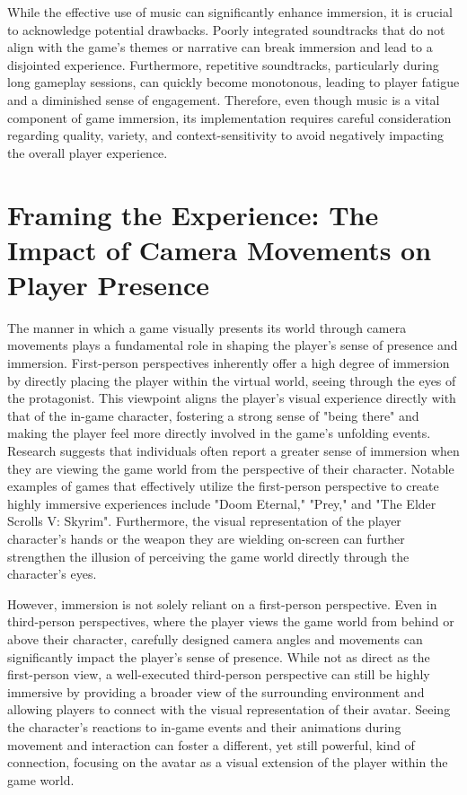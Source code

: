 \documentclass{article}
\begin{document}
    While the effective use of music can significantly enhance immersion, it is crucial to acknowledge potential drawbacks. Poorly integrated soundtracks that do not align with the game's themes or narrative can break immersion and lead to a disjointed experience. Furthermore, repetitive soundtracks, particularly during long gameplay sessions, can quickly become monotonous, leading to player fatigue and a diminished sense of engagement. Therefore, even though music is a vital component of game immersion, its implementation requires careful consideration regarding quality, variety, and context-sensitivity to avoid negatively impacting the overall player experience.

    \section{Framing the Experience: The Impact of Camera Movements on Player Presence}

    The manner in which a game visually presents its world through camera movements plays a fundamental role in shaping the player's sense of presence and immersion. First-person perspectives inherently offer a high degree of immersion by directly placing the player within the virtual world, seeing through the eyes of the protagonist. This viewpoint aligns the player's visual experience directly with that of the in-game character, fostering a strong sense of "being there" and making the player feel more directly involved in the game's unfolding events. Research suggests that individuals often report a greater sense of immersion when they are viewing the game world from the perspective of their character. Notable examples of games that effectively utilize the first-person perspective to create highly immersive experiences include "Doom Eternal," "Prey," and "The Elder Scrolls V: Skyrim". Furthermore, the visual representation of the player character's hands or the weapon they are wielding on-screen can further strengthen the illusion of perceiving the game world directly through the character's eyes.

    However, immersion is not solely reliant on a first-person perspective. Even in third-person perspectives, where the player views the game world from behind or above their character, carefully designed camera angles and movements can significantly impact the player's sense of presence. While not as direct as the first-person view, a well-executed third-person perspective can still be highly immersive by providing a broader view of the surrounding environment and allowing players to connect with the visual representation of their avatar. Seeing the character's reactions to in-game events and their animations during movement and interaction can foster a different, yet still powerful, kind of connection, focusing on the avatar as a visual extension of the player within the game world.
\end{document}
